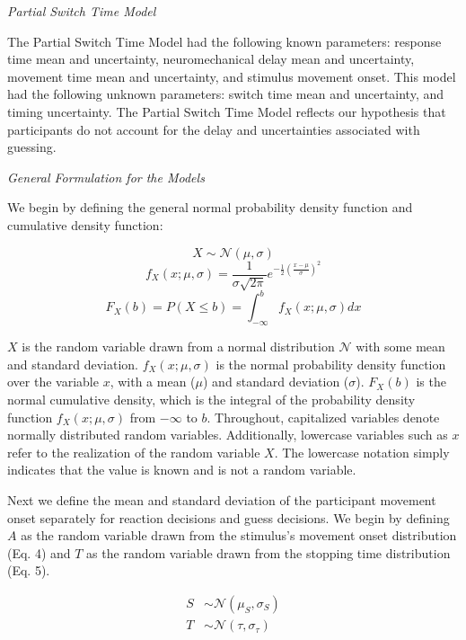 \documentclass[12pt,letterpaper]{article}
\begin{document}
\emph{Partial Switch Time Model}

The Partial Switch Time Model had the following known parameters: response time mean and uncertainty, neuromechanical delay mean and uncertainty, movement time mean and uncertainty, and stimulus movement onset. This model had the following unknown parameters: switch time mean and uncertainty, and timing uncertainty. The Partial Switch Time Model reflects our hypothesis that participants do not account for the delay and uncertainties associated with guessing.

\emph{General Formulation for the Models}

We begin by defining the general normal probability density function and cumulative density function:

\begin{equation}
    X\sim\mathcal{N}(\mu,\sigma)
\end{equation}
\begin{equation}
    f_{X}(x; \mu, \sigma) = \frac{1}{\sigma\sqrt{2\pi}}e^{-\frac{1}{2}(\frac{x-\mu}{\sigma})^2}
\end{equation}
\begin{equation}
    F_{X}(b) = P(X \leq b) = \int_{-\infty}^{b} f_{X}(x; \mu, \sigma)dx
\end{equation}

$X$ is the random variable drawn from a normal distribution $\mathcal{N}$ with some mean and standard deviation. $f_{X}(x;\mu,\sigma)$ is the normal probability density function over the variable $x$, with a mean ($\mu$) and standard deviation ($\sigma$). $F_{X}(b)$ is the normal cumulative density, which is the integral of the probability density function $f_{X}(x;\mu,\sigma)$ from $-\infty$ to $b$. Throughout, capitalized variables denote normally distributed random variables. Additionally, lowercase variables such as $x$ refer to the realization of the random variable $X$. The lowercase notation simply indicates that the value is known and is not a random variable.

Next we define the mean and standard deviation of the participant movement onset separately for reaction decisions and guess decisions. We begin by defining $A$ as the random variable drawn from the stimulus’s movement onset distribution (Eq. 4) and $T$ as the random variable drawn from the stopping time distribution (Eq. 5).


\begin{align}
    S & \sim\mathcal{N}(\mu_{S},\sigma_{S}) \\
    T & \sim\mathcal{N}(\tau,\sigma_{\tau})
\end{align}
\end{document}
